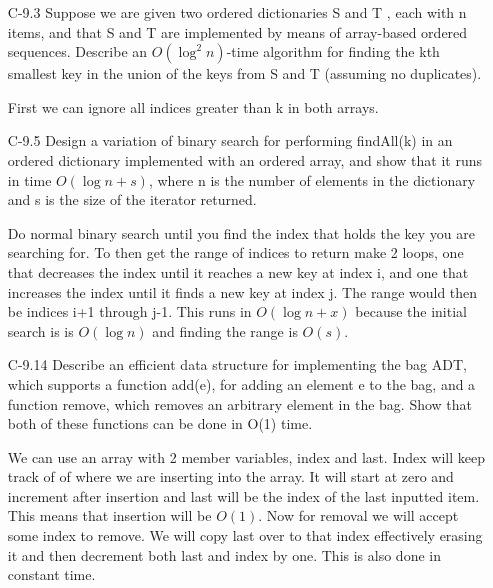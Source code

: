 \begin{itemize}
    \item[C-9.3] Suppose we are given two ordered dictionaries S and T , each with n items,
          and that S and T are implemented by means of array-based ordered sequences.
          Describe an $O(\log^2n)$-time algorithm for finding the kth smallest key in the union
          of the keys from S and T (assuming no duplicates).

          \answer First we can ignore all indices greater than k in both arrays.

    \item[C-9.5] Design a variation of binary search for performing findAll(k) in an ordered
          dictionary implemented with an ordered array, and show that it runs in
          time $O(\log n + s)$, where n is the number of elements in the dictionary and
          s is the size of the iterator returned.

          \answer Do normal binary search until you find the index that holds the key you
          are searching for. To then get the range of indices to return make 2 loops, one
          that decreases the index until it reaches a new key at index i, and one that increases the
          index until it finds a new key at index j. The range would then be indices i+1 through j-1.
          This runs in $O(\log n + x)$ because the initial search is is $O(\log n)$ and finding the range
          is $O(s)$.

    \item[C-9.14] Describe an efficient data structure for implementing the bag ADT, which
          supports a function add(e), for adding an element e to the bag, and a
          function remove, which removes an arbitrary element in the bag. Show
          that both of these functions can be done in O(1) time.

          \answer We can use an array with 2 member variables, index and last. Index will keep track of 
          of where we are inserting into the array. It will start at zero and increment after insertion and
          last will be the index of the last inputted item. This means that insertion will be $O(1)$. Now for removal
          we will accept some index to remove. We will copy last over to that index effectively erasing it and then 
          decrement both last and index by one. This is also done in constant time.













\end{itemize}